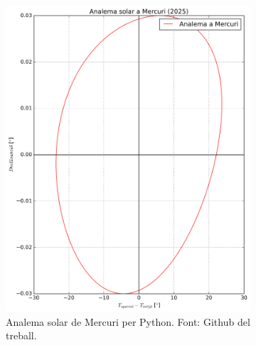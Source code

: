 \documentclass[a4paper, 11pt]{article}
\begin{document}
\begin{figure}[h!]
    \centering
    \begin{subfigure}{0.52\textwidth}
        \centering
        \includegraphics[width=\textwidth]{images/analema_Mercuri.png}
        \caption{Analema solar de Mercuri per Python. Font: Github del treball.}
    \end{subfigure}
    \hspace{0.05\textwidth}
    \begin{subfigure}{0.38\textwidth}
        \centering

\end{subfigure}
\end{figure}
\end{document}
